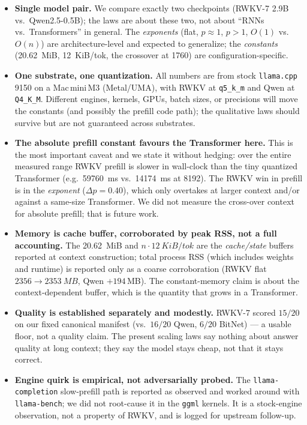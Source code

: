 \documentclass[11pt,a4paper]{article}
\newcommand{\ctx}{\ensuremath{n}}
\begin{document}
\begin{itemize}
  \item \textbf{Single model pair.} We compare exactly two checkpoints
    (RWKV-7 2.9B vs.\ Qwen2.5-0.5B); the laws are about these two, not about
    ``RNNs vs.\ Transformers'' in general. The \emph{exponents} (flat,
    \(p\approx1\), \(p>1\), \(O(1)\) vs.\ \(O(\ctx)\)) are architecture-level and
    expected to generalize; the \emph{constants} (\SI{20.62}{MiB},
    \SI{12}{KiB/tok}, the crossover at \num{1760}) are configuration-specific.
  \item \textbf{One substrate, one quantization.} All numbers are from stock
    \texttt{llama.cpp} 9150 on a Mac\,mini\,M3 (Metal/UMA), with RWKV at
    \texttt{q5\_k\_m} and Qwen at \texttt{Q4\_K\_M}. Different engines, kernels,
    GPUs, batch sizes, or precisions will move the constants (and possibly the
    prefill code path); the qualitative laws should survive but are not
    guaranteed across substrates.
  \item \textbf{The absolute prefill constant favours the Transformer here.}
    This is the most important caveat and we state it without hedging: over the
    entire measured range RWKV prefill is slower in wall-clock than the tiny
    quantized Transformer (e.g.\ \SI{59760}{ms} vs.\ \SI{14174}{ms} at
    \num{8192}). The RWKV win in prefill is in the \emph{exponent}
    (\(\Delta p = 0.40\)), which only overtakes at larger context and/or against
    a same-size Transformer. We did not measure the cross-over context for
    absolute prefill; that is future work.
  \item \textbf{Memory is cache buffer, corroborated by peak RSS, not a full
    accounting.} The \SI{20.62}{MiB} and \(\ctx\cdot\SI{12}{KiB/tok}\) are the
    \emph{cache/state} buffers reported at context construction; total process
    RSS (which includes weights and runtime) is reported only as a coarse
    corroboration (RWKV flat \(2356\to\SI{2353}{MB}\), Qwen \(+194\,\)MB). The
    constant-memory claim is about the context-dependent buffer, which is the
    quantity that grows in a Transformer.
  \item \textbf{Quality is established separately and modestly.} RWKV-7 scored
    \(15/20\) on our fixed canonical manifest (vs.\ \(16/20\) Qwen, \(6/20\)
    BitNet) --- a usable floor, not a quality claim. The present scaling laws say
    nothing about answer quality at long context; they say the model stays cheap,
    not that it stays correct.
  \item \textbf{Engine quirk is empirical, not adversarially probed.} The
    \texttt{llama-completion} slow-prefill path is reported as observed and
    worked around with \texttt{llama-bench}; we did not root-cause it in the
    \texttt{ggml} kernels. It is a stock-engine observation, not a property of
    RWKV, and is logged for upstream follow-up.
\end{itemize}
\end{document}

